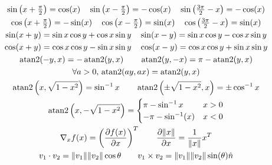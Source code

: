 \documentclass[twocolumn, 8pt]{extarticle}
\begin{document}
\begin{gather*}
    {\textstyle\sin\left(x + \frac{\pi}{2}\right) = \cos(x) \quad \sin\left(x - \frac{\pi}{2}\right) = -\cos(x) \quad \sin\left(\frac{3\pi}{2} - x\right) = -\cos(x)} \\
    {\textstyle\cos\left(x + \frac{\pi}{2}\right) = -\sin(x) \quad \cos\left(x - \frac{\pi}{2}\right) = \sin(x) \quad \cos\left(\frac{3\pi}{2} - x\right) = \sin(x)} \\
    \sin(x + y) = \sin x\cos y + \cos x\sin y \quad \sin(x - y) = \sin x\cos y - \cos x\sin y \\
    \cos(x + y) = \cos x\cos y - \sin x\sin y \quad \cos(x - y) = \cos x\cos y + \sin x\sin y \\
    \operatorname{atan2}(-y, x) = -\operatorname{atan2}(y, x) \qquad \operatorname{atan2}(y, -x) = \pi - \operatorname{atan2}(y, x) \\
    \forall a > 0,\,\operatorname{atan2}(ay, ax) = \operatorname{atan2}(y, x) \\
    \operatorname{atan2}\left(x, \sqrt{1 - x^2}\right) = \sin^{-1} x \qquad \operatorname{atan2}\left(\pm\sqrt{1 - x^2}, x\right) = \pm\cos^{-1} x \\
    \operatorname{atan2}\left(x, -\sqrt{1 - x^2}\right) = \begin{cases} {\pi - \sin^{-1}x} & {x > 0} \\ {-\pi - \sin^{-1}(x)} & {x < 0} \end{cases} \\
    \nabla _x f(x) = \left(\frac{\partial f(x)}{\partial x}\right)^T \qquad \frac{\partial\lVert x\rVert}{\partial x} = \frac{1}{\lVert x\rVert}x^T \\
    v_1 \cdot v_2 = \lVert v_1\rVert\lVert v_2\rVert\cos\theta \qquad v_1 \times v_2 = \lVert v_1\rVert\lVert v_2\rVert\sin(\theta)\hat n
\end{gather*}
\end{document}
